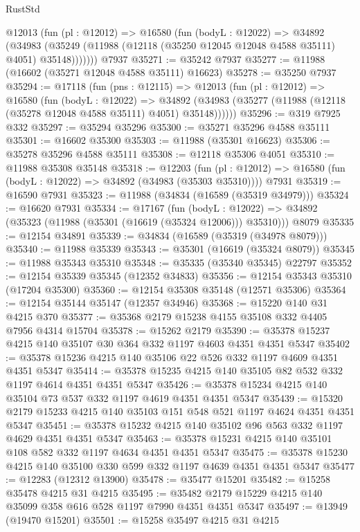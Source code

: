 \begin{lexlean}{RustStd}
\begin{coremodule}
      @12013
        (fun (pl : @12012) =>
        @16580
          (fun (bodyL : @12022) =>
          @34892
            (@34983 (@35249 (@11988 (@12118 (@35250 @12045 @12048 @4588 @35111) @4051) @35148)))))))
    @7937
@35271 := @35242 @7937
@35277 := @11988 (@16602 (@35271 @12048 @4588 @35111) @16623)
@35278 := @35250 @7937
@35294 := @17118
    (fun (pns : @12115) =>
    @12013
      (fun (pl : @12012) =>
      @16580
        (fun (bodyL : @12022) =>
        @34892 (@34983 (@35277 (@11988 (@12118 (@35278 @12048 @4588 @35111) @4051) @35148))))))
@35296 := @319 @7925 @332
@35297 := @35294 @35296
@35300 := @35271 @35296 @4588 @35111
@35301 := @16602 @35300
@35303 := @11988 (@35301 @16623)
@35306 := @35278 @35296 @4588 @35111
@35308 := @12118 @35306 @4051
@35310 := @11988 @35308 @35148
@35318 := @12203
    (fun (pl : @12012) => @16580 (fun (bodyL : @12022) => @34892 (@34983 (@35303 @35310))))
    @7931
@35319 := @16590 @7931
@35323 := @11988 (@34834 (@16589 (@35319 @34979)))
@35324 := @16620 @7931
@35334 := @17167
    (fun (bodyL : @12022) => @34892 (@35323 (@11988 (@35301 (@16619 (@35324 @12006))) @35310)))
    @8079
@35335 := @12154 @34891
@35339 := @34834 (@16589 (@35319 (@34978 @8079)))
@35340 := @11988 @35339
@35343 := @35301 (@16619 (@35324 @8079))
@35345 := @11988 @35343 @35310
@35348 := @35335 (@35340 @35345) @22797
@35352 := @12154 @35339 @35345 (@12352 @34833)
@35356 := @12154 @35343 @35310 (@17204 @35300)
@35360 := @12154 @35308 @35148 (@12571 @35306)
@35364 := @12154 @35144 @35147 (@12357 @34946)
@35368 := @15220 @140 @31 @4215 @370
@35377 := @35368 @2179 @15238 @4155 @35108 @332 @4405 @7956 @4314 @15704
@35378 := @15262 @2179
@35390 := @35378 @15237 @4215 @140 @35107 @30 @364 @332 @1197 @4603 @4351 @4351 @5347
@35402 := @35378 @15236 @4215 @140 @35106 @22 @526 @332 @1197 @4609 @4351 @4351 @5347
@35414 := @35378 @15235 @4215 @140 @35105 @82 @532 @332 @1197 @4614 @4351 @4351 @5347
@35426 := @35378 @15234 @4215 @140 @35104 @73 @537 @332 @1197 @4619 @4351 @4351 @5347
@35439 := @15320 @2179 @15233 @4215 @140 @35103 @151 @548 @521 @1197 @4624 @4351 @4351 @5347
@35451 := @35378 @15232 @4215 @140 @35102 @96 @563 @332 @1197 @4629 @4351 @4351 @5347
@35463 := @35378 @15231 @4215 @140 @35101 @108 @582 @332 @1197 @4634 @4351 @4351 @5347
@35475 := @35378 @15230 @4215 @140 @35100 @330 @599 @332 @1197 @4639 @4351 @4351 @5347
@35477 := @12283 (@12312 @13900)
@35478 := @35477 @15201
@35482 := @15258 @35478 @4215 @31 @4215
@35495 := @35482 @2179 @15229 @4215 @140 @35099 @358 @616 @528 @1197 @7990 @4351 @4351 @5347
@35497 := @13949 (@19470 @15201)
@35501 := @15258 @35497 @4215 @31 @4215

\end{coremodule}
\end{lexlean}

